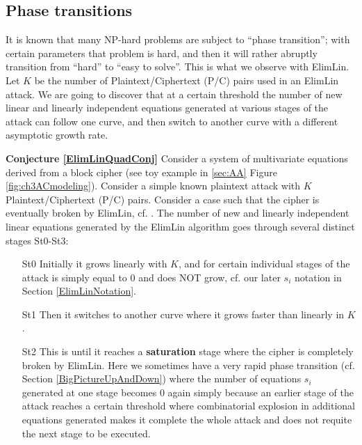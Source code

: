 \subsection{Phase transitions}

It is known that many NP-hard problems are subject to ``phase transition''; with certain parameters that problem is hard, and then it will rather abruptly transition from ``hard'' to ``easy to solve''. This is what we observe with ElimLin. %
Let $K$ be the number of Plaintext/Ciphertext (P/C) pairs used in an ElimLin attack. We are going to discover that at a certain threshold the number of new linear and linearly independent equations
generated at various stages of the attack can follow one curve,
and then switch to another curve with a different asymptotic growth rate.



{\bf Conjecture \ref{ElimLinQuadConj}}
\label{ElimLinQuadConj}
Consider a system of multivariate equations derived from a block cipher (see toy example in \ref{sec:AA} Figure \ref{fig:ch3ACmodeling}). %
Consider a simple known plaintext attack with $K$ Plaintext/Ciphertext (P/C) pairs.
Consider a case such that the cipher is eventually broken by ElimLin, cf. \cite{FastAlg,FastAlg2,ToyRijSer,AlgteachElimLinLab,RaddumSimon}.
The number of new and linearly independent linear equations generated
by the ElimLin algorithm goes through several distinct stages St0-St3:

\begin{enumerate}
	\item[St0]
	Initially it grows linearly with $K$,
	and for certain individual stages of the attack is
	simply equal to 0 and does NOT grow,
	cf. our later $s_i$ notation in Section \ref{ElimLinNotation}.
	\item[St1]
	Then it switches to another curve where
	it grows faster than linearly in $K$.
	\item[St2]
	This is until it reaches a \textbf{saturation} stage where the
	cipher is completely broken by ElimLin.
	Here we sometimes have a very rapid phase transition (cf. Section \ref{BigPictureUpAndDown})
	where the number of equations $s_i$ generated at one stage becomes 0 again
	simply because an earlier stage of the attack reaches a certain threshold where combinatorial explosion
	in additional equations generated
	makes it complete the whole attack and does not requite the next stage to be executed.
\end{enumerate}

